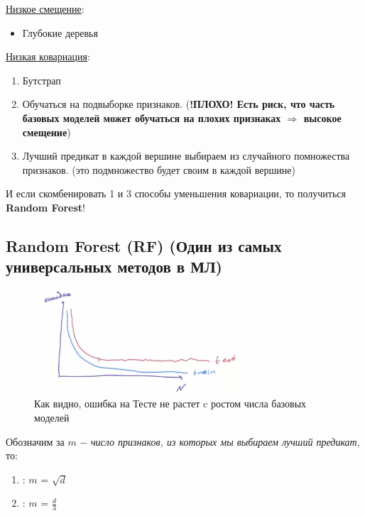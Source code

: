         \underline{Низкое смещение}:
        \begin{itemize}
            \item Глубокие деревья
        \end{itemize}

        \underline{Низкая ковариация}:
        \begin{enumerate}
            \item Бутстрап

            \item Обучаться на подвыборке признаков. (\textbf{!ПЛОХО! Есть риск, что часть базовых моделей может обучаться на плохих признаках $\Longrightarrow$ высокое смещение})

            \item Лучший предикат в каждой вершине выбираем из случайного помножества признаков. (это подмножество будет своим в каждой вершине)
        \end{enumerate}

        И если скомбенировать 1 и 3 способы уменьшения ковариации, то получиться \textbf{Random Forest}!

        \subsection{Random Forest (RF) (Один из самых универсальных методов в МЛ)}

        \begin{figure}[H]
            \centering
            \includegraphics[width=0.7\textwidth]{images/10lecture/RF_curve.png}
            \caption{Как видно, ошибка на Тесте не растет c ростом числа базовых моделей}
        \end{figure}

        Обозначим за $m$ $-$ \textit{число признаков, из которых мы выбираем лучший предикат}, то:
        \begin{enumerate}
            \item {}: $m$ = $\sqrt{d}$

            \item {}: $m$ = $\frac{d}{3}$ \\
        \end{enumerate}

